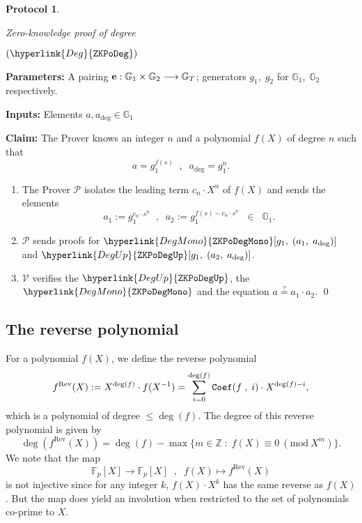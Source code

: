 \documentclass[11pt, lettersize, notitlepage, leqno, footskip=0.6cm]{article}
\newcommand{\bz}{\mathbb Z}
\newcommand{\bFp}{\mathbb{F}_p}
\newcommand{\lra}{\longrightarrow}
\newcommand{\mc}{\mathcal}
\newcommand{\mb}{\mathbb}
\newcommand{\mr}{\mathrm}
\newcommand{\mP}{\mc{P}}
\newcommand{\V}{\mc{V}}
\newcommand{\vs}{\vspace{-0.15cm}}
\newcommand{\sta}{\stackrel{?}{=}}
\newcommand{\Mod}[1]{\ (\mathrm{mod}\ #1)}
\newtheorem{Prot}[Thm]{Protocol}
\numberwithin{equation}{section}
\begin{document}
\begin{mdframed}
\begin{Prot} \hypertarget{Deg}{Zero-knowledge proof of degree} $(\hyperlink{Deg}{\tt{ZKPoDeg}})$\end{Prot}  

\noindent \textbf{Parameters:} A pairing ${\bf{e}}:\mb{G}_1\times \mb{G}_2\lra \mb{G}_T$; generators $g_1,\;g_2$ for $\mb{G}_1,\; \mb{G}_2$ respectively.


\noindent \textbf{Inputs:} Elements $a, a_{\deg}\in \mb{G}_1$

\noindent \textbf{Claim:} The Prover knows an integer $n$ and a polynomial $f(X)$ of degree $n$ such that \vs $$a = g_1^{f(s)}\;\;,\;\;a_{\deg} = g_1^n.$$ 

\begin{enumerate}[wide, labelwidth=!, labelindent=0pt, itemsep=-0.2ex]


\item The Prover $\mP$ isolates the leading term $c_n\cdot X^n$ of $f(X)$ and sends the elements \vs $$a_{1}:= g_1^{c_n\cdot s^n}\;\;,\;\; a_{2}:= g_1^{f(s) - c_n\cdot  s^n}\;\;\in\;\;\mb{G}_1.$$

\item $\mP$ sends proofs for $\hyperlink{DegMono}{\tt{ZKPoDegMono}}[g_1,\;(a_{1},\; a_{\deg})]$ and $\hyperlink{DegUp}{\tt{ZKPoDegUp}}[g_1,\;(a_{2},\; a_{\deg})]$.

\item $\V$ verifies the $\hyperlink{DegUp}{\tt{ZKPoDegUp}}$, the $\hyperlink{DegMono}{\tt{ZKPoDegMono}}$ and the equation $a \sta a_{1}\cdot a_{2} $. \qed \end{enumerate}
\end{mdframed}


\bigskip

\subsection{\fontsize{11}{11}\selectfont The reverse polynomial}

For a polynomial $f(X)$, we define the reverse polynomial \vs $$f^{\mr{Rev}}(X):= X^{\deg(f)}\cdot f(X^{-1}) = \sum\limits_{i=0}^{\deg(f)} {\tt{Coef}}(f\;,\;i)\cdot X^{\deg(f)-i}, $$  which is a polynomial of degree $\leq \deg(f)$. The degree of this reverse polynomial is given by $$ \deg(f^{\mr{Rev}}(X)) = \deg(f) - \max\{m\in \bz\; : \; f(X)\equiv 0\Mod{X^m}\}.   $$ We note that the map $$ \bFp[X] \lra \bFp[X]\;\;,\;\;f(X)\mapsto f^{\mr{Rev}}(X) $$ is not injective since for any integer $k$, $f(X)\cdot X^k$ has the same reverse as $f(X)$. But the map does yield an involution when restricted to the set of polynomials co-prime to $X$. 
\end{document}
